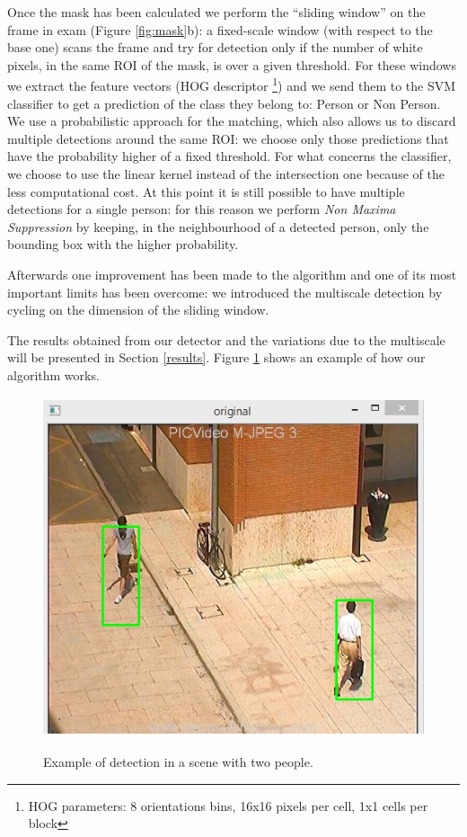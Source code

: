 \documentclass[a4paper,letterpaper, 11pt, onecolumn]{article} %
\begin{document}
Once the mask has been calculated we perform the ``sliding window'' on the frame in exam (Figure \ref{fig:mask}b): a fixed-scale window (with respect to the base one) scans the frame and try for detection only if the number of white pixels, in the same ROI of the mask, is over a given threshold. For these windows we extract the feature vectors (HOG descriptor \footnote{HOG parameters: 8 orientations bins, 16x16 pixels per cell, 1x1 cells per block}) and we send them to the SVM classifier to get a prediction of the class they belong to: Person or Non Person. We use a probabilistic approach for the matching, which also allows us to discard multiple detections around the same ROI: we choose only those predictions that have the probability higher of a fixed threshold. For what concerns the classifier, we choose to use the linear kernel instead of the intersection one because of the less computational cost. At this point it is still possible to have multiple detections for a single person: for this reason we perform \emph{Non Maxima Suppression} by keeping, in the neighbourhood  of a detected person, only the bounding box with the higher probability.

Afterwards one improvement has been made to the algorithm and one of its most important limits has been overcome: we introduced the multiscale detection by cycling on the dimension of the sliding window. 

The results obtained from our detector and the variations due to the multiscale will be presented in Section \ref{results}. Figure \ref{fig:algorithm detection} shows an example of how our algorithm works.
\
\begin{figure}[h!]
\centering
{\includegraphics[height=10cm]{immagine1.JPG} }

\caption{Example of detection in a scene with two people.}
\label{fig:algorithm detection}
\end{figure}
\pagebreak
\end{document}
